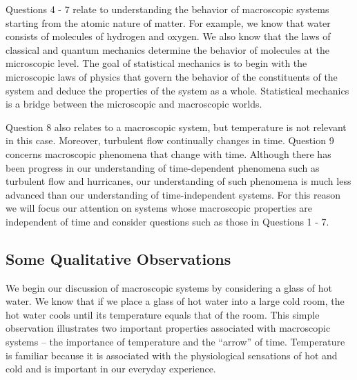 Questions 4 - 7 relate to understanding the behavior of macroscopic systems starting from the atomic nature of matter.
For example, we know that water consists of molecules of hydrogen and oxygen.
We also know that the laws of classical and quantum mechanics determine the behavior of molecules at the microscopic level.
The goal of statistical mechanics is to begin with the microscopic laws of physics that govern the behavior of the constituents of the system and deduce the properties of the system as a whole.
Statistical mechanics is a bridge between the microscopic and macroscopic worlds.

Question 8 also relates to a macroscopic system, but temperature is not relevant in this case.
Moreover, turbulent flow continually changes in time.
Question 9 concerns macroscopic phenomena that change with time.
Although there has been progress in our understanding of time-dependent phenomena such as turbulent flow and hurricanes, our understanding of such phenomena is much less advanced than our understanding of time-independent systems.
For this reason we will focus our attention on systems whose macroscopic properties are independent of time and consider questions such as those in Questions 1 - 7.


\subsection{Some Qualitative Observations}

We begin our discussion of macroscopic systems by considering a glass of hot water.
We know that if we place a glass of hot water into a large cold room, the hot water cools until its temperature equals that of the room.
This simple observation illustrates two important properties associated with macroscopic systems -- the importance of temperature and the ``arrow'' of time.
Temperature is familiar because it is associated with the physiological sensations of hot and cold and is important in our everyday experience.
